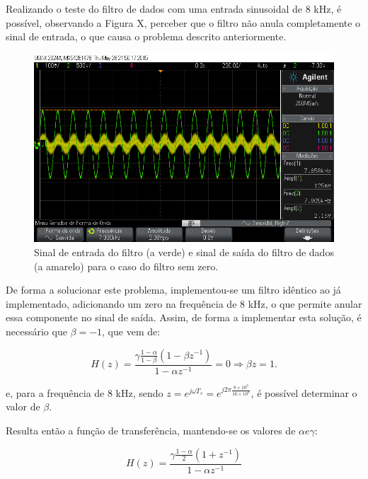 \documentclass[11pt]{article}
\numberwithin{equation}{section}
\begin{document}
{Realizando o teste do filtro de dados com uma entrada sinusoidal de 8 kHz, é possível, observando a Figura X, perceber que o filtro não anula completamente o sinal de entrada, o que causa o problema descrito anteriormente. 

\begin{figure}[H]
	\centering
	\includegraphics[keepaspectratio=true, scale=0.37]{exps/FiltroSemZero8k}
	\caption{Sinal de entrada do filtro (a verde) e sinal de saída do filtro de dados (a amarelo) para o caso do filtro sem zero.}
	\vspace{-0.8em}
\end{figure} 

De forma a solucionar este problema, implementou-se um filtro idêntico ao já implementado, adicionando um zero na frequência de 8 kHz, o que permite anular essa componente no sinal de saída. Assim, de forma a implementar esta solução, é necessário que $\beta = -1$, que vem de:

\vspace{-3mm}
\begin{equation}
H(z) = \frac{\gamma \frac{1-\alpha}{1-\beta} (1-\beta z^{-1})}{1-\alpha z^{-1}} = 0 \Rightarrow \beta z = 1.
\end{equation}

\vspace{1mm}
e, para a frequência de 8 kHz, sendo $z = e^{j\omega T_s} = e^{j2\pi \frac{8\times 10^3}{16\times 10^3}}$, é possível determinar o valor de $\beta$.
	
Resulta então a função de transferência, mantendo-se os valores de $\alpha e \gamma$:

\vspace{-3mm}
\begin{equation}
H(z) = \frac{\gamma \frac{1-\alpha}{2} (1+z^{-1})}{1-\alpha z^{-1}}
\end{equation}

}
\end{document}
